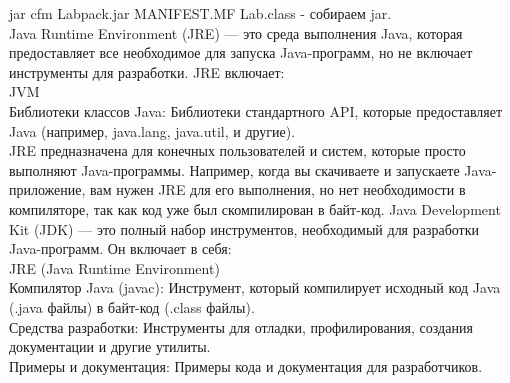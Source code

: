 jar cfm Labpack.jar MANIFEST.MF Lab.class - собираем jar. \\
Java Runtime Environment (JRE) — это среда выполнения Java, которая предоставляет все необходимое для запуска Java-программ, но не включает инструменты для разработки. JRE включает: \\
JVM \\
Библиотеки классов Java: Библиотеки стандартного API, которые предоставляет Java (например, java.lang, java.util, и другие). \\
JRE предназначена для конечных пользователей и систем, которые просто выполняют Java-программы. Например, когда вы скачиваете и запускаете Java-приложение, вам нужен JRE для его выполнения, но нет необходимости в компиляторе, так как код уже был скомпилирован в байт-код.
Java Development Kit (JDK) — это полный набор инструментов, необходимый для разработки Java-программ. Он включает в себя: \\
JRE (Java Runtime Environment) \\
Компилятор Java (javac): Инструмент, который компилирует исходный код Java (.java файлы) в байт-код (.class файлы). \\
Средства разработки: Инструменты для отладки, профилирования, создания документации и другие утилиты. \\ 
Примеры и документация: Примеры кода и документация для разработчиков. \\

